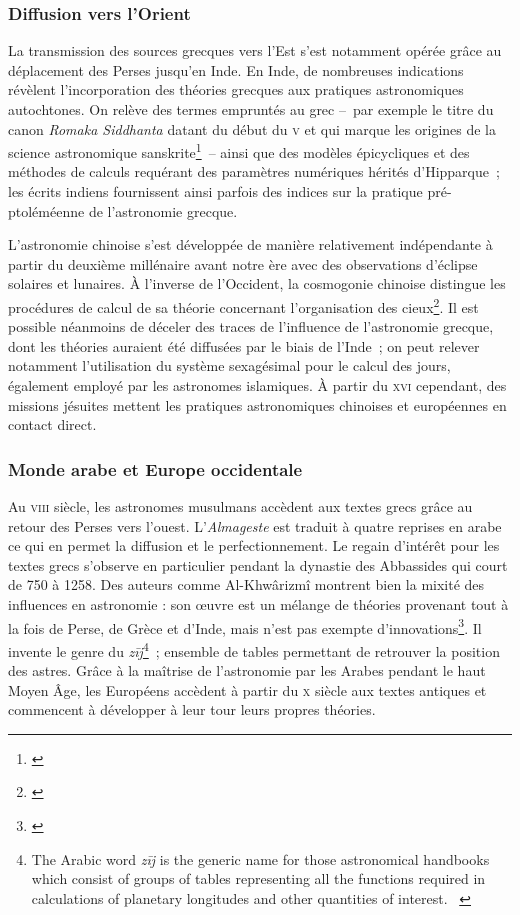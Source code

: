 \documentclass[a4paper,12pt,twoside]{book}
\newcommand{\eng}{\emph}
\newcommand{\V}{\textsc{v}\ieme{}\xspace}
\newcommand{\VIII}{\textsc{viii}\ieme{}\xspace}
\newcommand{\X}{\textsc{x}\ieme{}\xspace}
\newcommand{\XVI}{\textsc{xvi}\ieme{}\xspace}
\newcommand{\MA}{Moyen Âge\xspace}
\newcommand{\g}[1]{\og#1~\fg}
\begin{document}
			\subsubsection{Diffusion vers l'Orient}
La transmission des sources grecques vers l'Est s'est notamment opérée grâce au déplacement des Perses jusqu'en Inde. En Inde, de nombreuses indications révèlent l'incorporation des théories grecques aux pratiques astronomiques autochtones. On relève des termes empruntés au grec –~par exemple le titre du canon \emph{Romaka Siddhanta} datant du début du \V et qui marque les origines de la science astronomique sanskrite\footnote{\cite[p.~7]{mercierStudiesTransmissionMedieval2004}}~– ainsi que des modèles épicycliques et des méthodes de calculs requérant des paramètres numériques hérités d’Hipparque~; les écrits indiens fournissent ainsi parfois des indices sur la pratique pré-ptoléméenne de l'astronomie grecque.

L'astronomie chinoise s'est développée de manière relativement indépendante à partir du deuxième millénaire avant notre ère avec des observations d'éclipse solaires et lunaires. À l'inverse de l'Occident, la cosmogonie chinoise distingue les procédures de calcul de sa théorie concernant l'organisation des cieux\footnote{\cite[p.~438]{selinAstronomyCulturesHistory2000}}. Il est possible néanmoins de déceler des traces de l'influence de l'astronomie grecque, dont les théories auraient été diffusées par le biais de l'Inde~; on peut relever notamment l'utilisation du système sexagésimal pour le calcul des jours, également employé par les astronomes islamiques. À partir du \XVI cependant, des missions jésuites mettent les pratiques astronomiques chinoises et européennes en contact direct.

			\subsubsection{Monde arabe et Europe occidentale}
Au \VIII siècle, les astronomes musulmans accèdent aux textes grecs grâce au retour des Perses vers l’ouest. L'\emph{Almageste} est traduit à quatre reprises en arabe ce qui en permet la diffusion et le perfectionnement. Le regain d'intérêt pour les textes grecs s'observe en particulier pendant la dynastie des Abbassides qui court de 750 à 1258. Des auteurs comme Al-Khwârizmî montrent bien la mixité des influences en astronomie : son œuvre est un mélange de théories provenant tout à la fois de Perse, de Grèce et d'Inde, mais n'est pas exempte d'innovations\footnote{\cite{evansHistoryAstronomy}}. Il invente le genre du \eng{zīj}\footnote{\g{The Arabic word \emph{zīj} is the generic name for those astronomical handbooks which consist of groups of tables representing all the functions required in calculations of planetary longitudes and other quantities of interest.} \cite[p.~451]{mercierStudiesTransmissionMedieval2004}}~; ensemble de tables permettant de retrouver la position des astres. Grâce à la maîtrise de l'astronomie par les Arabes pendant le haut \MA, les Européens accèdent à partir du \X siècle aux textes antiques et commencent à développer à leur tour leurs propres théories.
\end{document}
